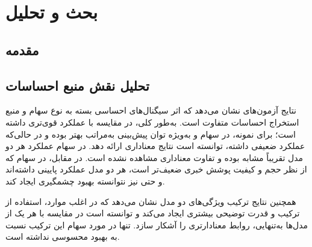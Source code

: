 \documentclass[12pt, a4paper]{report}
\begin{document}
\begin{table}[H]
\centering
\caption{مقایسه میانگین عملکرد دوره‌های عادی در برابر دوره‌های تصادفی}
\label{tab:avg-normal-vs-random}
\end{table}



\chapter{بحث و تحلیل}

\section{مقدمه}

\section{تحلیل نقش منبع احساسات}

نتایج آزمون‌های  نشان می‌دهد که اثر سیگنال‌های احساسی بسته به نوع سهام و منبع استخراج احساسات متفاوت است. 
به‌طور کلی،  در مقایسه با  عملکرد قوی‌تری داشته است؛ برای نمونه، در سهام  و به‌ویژه  توان پیش‌بینی  به‌مراتب بهتر بوده و در حالی‌که  عملکرد ضعیفی داشته،  توانسته است نتایج معناداری ارائه دهد. 
در سهام  عملکرد هر دو مدل تقریباً مشابه بوده و تفاوت معناداری مشاهده نشده است. 
در مقابل، در سهام  که از نظر حجم و کیفیت پوشش خبری ضعیف‌تر است، هر دو مدل عملکرد پایینی داشته‌اند و حتی  نیز نتوانسته بهبود چشمگیری ایجاد کند. 

همچنین نتایج ترکیب ویژگی‌های دو مدل نشان می‌دهد که در اغلب موارد، استفاده از ترکیب  و  قدرت توضیحی بیشتری ایجاد می‌کند و توانسته است در مقایسه با هر یک از مدل‌ها به‌تنهایی، روابط معنادارتری را آشکار سازد. تنها در مورد سهام  این ترکیب نسبت به  بهبود محسوسی نداشته است. 
\end{document}
